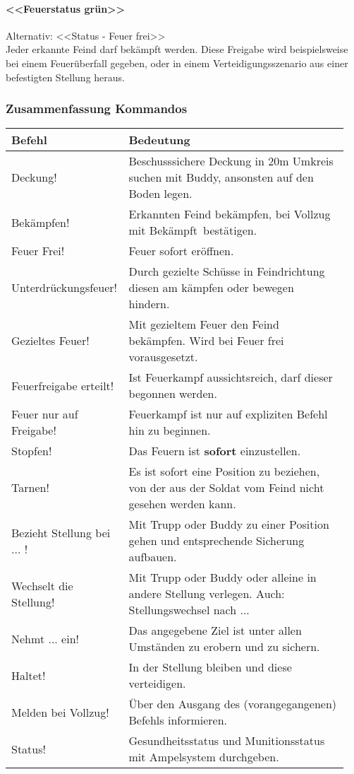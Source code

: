 \paragraph{<<Feuerstatus grün>>}
	Alternativ: <<Status - Feuer frei>>\hfil\\
	Jeder erkannte Feind darf bekämpft werden. Diese Freigabe wird beispielsweise bei einem Feuerüberfall gegeben, oder in einem Verteidigungsszenario aus einer befestigten Stellung heraus.
	
\subsubsection{Zusammenfassung Kommandos}
\begin{tabular}{|p{0.3\linewidth}|p{0.65\linewidth}|} \hline
	\textbf{Befehl} & \textbf{Bedeutung} \\ \hline
	Deckung! & Beschusssichere Deckung in 20m Umkreis suchen mit Buddy, ansonsten auf den Boden legen.\\ \hline
	Bekämpfen! & Erkannten Feind bekämpfen, bei Vollzug mit \glqq Bekämpft\grqq\, bestätigen.\\ \hline
	Feuer Frei! & Feuer sofort eröffnen.\\ \hline
	Unterdrückungsfeuer! & Durch gezielte Schüsse in Feindrichtung diesen am kämpfen oder bewegen hindern.\\ \hline
	Gezieltes Feuer! & Mit gezieltem Feuer den Feind bekämpfen. Wird bei \glqq Feuer frei\grqq\, vorausgesetzt.\\ \hline
	Feuerfreigabe erteilt! & Ist Feuerkampf aussichtsreich, darf dieser begonnen werden.\\ \hline
	Feuer nur auf Freigabe! & Feuerkampf ist nur auf expliziten Befehl hin zu beginnen.\\ \hline
	Stopfen! & Das Feuern ist \textbf{sofort} einzustellen.\\ \hline
	Tarnen! & Es ist sofort eine Position zu beziehen, von der aus der Soldat vom Feind nicht gesehen werden kann.\\ \hline
	Bezieht Stellung bei ... ! & Mit Trupp oder Buddy zu einer Position gehen und entsprechende Sicherung aufbauen.\\ \hline
	Wechselt die Stellung! & Mit Trupp oder Buddy oder alleine in andere Stellung verlegen. Auch: \glqq Stellungswechsel nach ...\grqq\\ \hline
	Nehmt ... ein! & Das angegebene Ziel ist unter allen Umständen zu erobern und zu sichern.\\ \hline
	Haltet! & In der Stellung bleiben und diese verteidigen.\\ \hline
	Melden bei Vollzug! & Über den Ausgang des (vorangegangenen) Befehls informieren. \\ \hline
	Status! & Gesundheitsstatus und Munitionsstatus mit Ampelsystem durchgeben.\\ \hline
\end{tabular}
